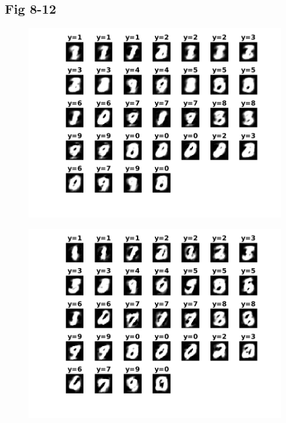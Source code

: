 \documentclass{article}
\begin{document}
\subsection{Fig 8-12}
\begin{figure}[h!]
\begin{multicols}{3}
\includegraphics[width=1\columnwidth]{RunResults2/8.png}
\label{8}

\includegraphics[width=1\columnwidth]{RunResults2/9.png}
\label{9}


\end{multicols}
\end{figure}
\end{document}
